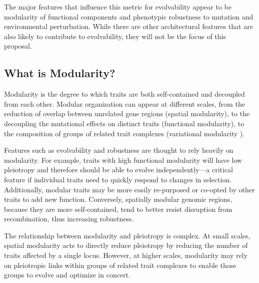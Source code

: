 \documentclass[PhD]{msu-thesis}
\begin{document}
The major features that influence this metric for evolvability appear to be modularity of functional components and phenotypic robustness to mutation and environmental perturbation. While there are other architectural features that are also likely to contribute to evolvability, they will not be the focus of this proposal.



\subsection{What is Modularity?}

Modularity is the degree to which traits are both self-contained and decoupled from each other. Modular organization can appear at different scales, from the reduction of overlap between unrelated gene regions (spatial modularity\cite{misevic_sexual_2006}), to the decoupling the mutational effects on distinct traits (functional modularity\cite{gunter_p._wagner_perspective:_1996}), to the composition of groups of related trait complexes (variational modularity \cite{gunter_p._wagner_pleiotropic_2011,ravasz_hierarchical_2002}).

Features such as evolvability and robustness are thought to rely heavily on modularity\cite{gunter_p._wagner_perspective:_1996}. For example, traits with high functional modularity will have low pleiotropy and therefore should be able to evolve independently---a critical feature if individual traits need to quickly respond to changes in selection. Additionally, modular traits may be more easily re-purposed or co-opted by other traits to add new function\cite{ravasz_hierarchical_2002}.
Conversely, spatially modular genomic regions, because they are more self-contained, tend to better resist disruption from recombination, thus increasing robustness\cite{misevic_sexual_2006}. 

The relationship between modularity and pleiotropy is complex. At small scales, spatial modularity acts to directly reduce pleiotropy by reducing the number of traits affected by a single locus\cite{misevic_sexual_2006}. However, at higher scales, modularity may rely on pleiotropic links within groups of related trait complexes to enable those groups to evolve and optimize in concert\cite{gunter_p._wagner_pleiotropic_2011}. 
\end{document}
